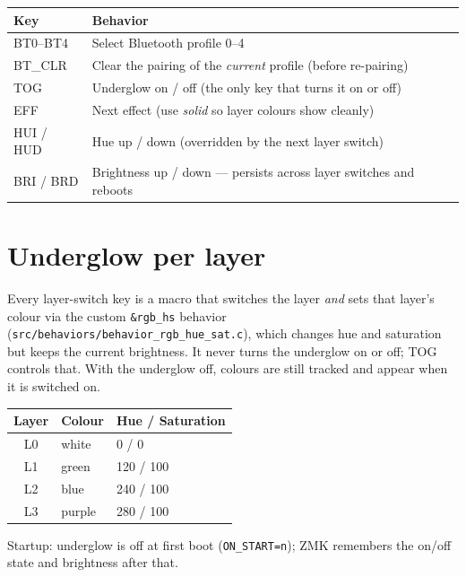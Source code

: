 \documentclass[11pt, letterpaper]{article}
\begin{document}
\begin{tabular}{lp{11cm}}
\toprule
\textbf{Key} & \textbf{Behavior} \\
\midrule
BT0--BT4 & Select Bluetooth profile 0--4 \\
BT\_CLR & Clear the pairing of the \emph{current} profile (before re-pairing) \\
TOG & Underglow on / off (the only key that turns it on or off) \\
EFF & Next effect (use \emph{solid} so layer colours show cleanly) \\
HUI / HUD & Hue up / down (overridden by the next layer switch) \\
BRI / BRD & Brightness up / down --- persists across layer switches and reboots \\
\bottomrule
\end{tabular}

\section{Underglow per layer}

Every layer-switch key is a macro that switches the layer \emph{and}
sets that layer's colour via the custom \texttt{\&rgb\_hs} behavior
(\texttt{src/behaviors/behavior\_rgb\_hue\_sat.c}), which changes hue and
saturation but keeps the current brightness. It never turns the
underglow on or off; TOG controls that. With the underglow off, colours
are still tracked and appear when it is switched on.

\begin{center}
\begin{tabular}{cll}
\toprule
\textbf{Layer} & \textbf{Colour} & \textbf{Hue / Saturation} \\
\midrule
L0 & white  & 0 / 0 \\
L1 & green  & 120 / 100 \\
L2 & blue   & 240 / 100 \\
L3 & purple & 280 / 100 \\
\bottomrule
\end{tabular}
\end{center}

Startup: underglow is off at first boot (\texttt{ON\_START=n}); ZMK
remembers the on/off state and brightness after that.

\end{document}
